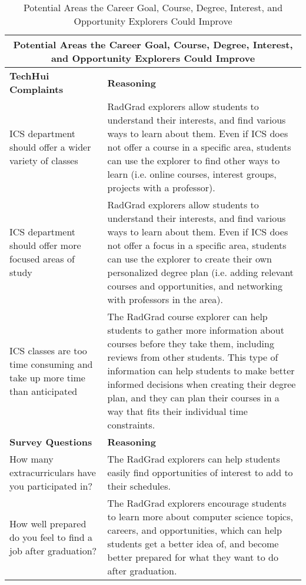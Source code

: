 \begin{table}[htbp!]
\centering
\begin{tabular}{  |p{4cm}|p{12cm}| } 
\hline
 \multicolumn{2}{|c|}{Potential Areas the Career Goal, Course, Degree, Interest, and Opportunity Explorers Could Improve}\\
  \hline
 \textbf{TechHui Complaints} & \textbf{Reasoning} \\ 
  \hline
ICS department should offer a wider variety of classes & RadGrad explorers allow students to understand their interests, and find various ways to learn about them. Even if ICS does not offer a course in a specific area, students can use the explorer to find other ways to learn (i.e. online courses, interest groups, projects with a professor). \\
\hline
ICS department should offer more focused areas of study & RadGrad explorers allow students to understand their interests, and find various ways to learn about them. Even if ICS does not offer a focus in a specific area, students can use the explorer to create their own personalized degree plan (i.e. adding relevant courses and opportunities, and networking with professors in the area). \\
\hline
ICS classes are too time consuming and take up more time than anticipated & The RadGrad course explorer can help students to gather more information about courses before they take them, including reviews from other students. This type of information can help students to make better informed decisions when creating their degree plan, and they can plan their courses in a way that fits their individual time constraints.\\
\hline
 \textbf{Survey Questions} & \textbf{Reasoning} \\ 
  \hline
  How many extracurriculars have you participated in? & The RadGrad explorers can help students easily find opportunities of interest to add to their schedules.\\
  \hline
  How well prepared do you feel to find a job after graduation? & The RadGrad explorers encourage students to learn more about computer science topics, careers, and opportunities, which can help students get a better idea of, and become better prepared for what they want to do after graduation.\\
  \hline
\end{tabular}
 \caption{Potential Areas the Career Goal, Course, Degree, Interest, and Opportunity Explorers Could Improve}
\end{table}

